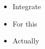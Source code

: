 





\begin{summary}
\begin{itemize}
\item Integrate
\item For this
\item Actually
\end{itemize}
\end{summary}


 